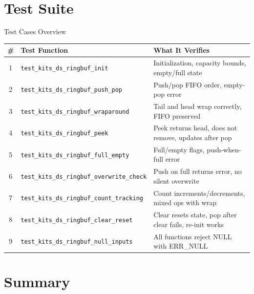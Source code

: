 \documentclass[aspectratio=169, 10pt]{beamer}
\begin{document}
\section{Test Suite}

\begin{frame}{Test Cases Overview}
\begin{table}
\centering
\small
\begin{tabular}{@{}clp{7cm}@{}}
\toprule
\textbf{\#} & \textbf{Test Function} & \textbf{What It Verifies} \\
\midrule
1 & \texttt{test\_kits\_ds\_ringbuf\_init}
  & Initialization, capacity bounds, empty/full state \\
2 & \texttt{test\_kits\_ds\_ringbuf\_push\_pop}
  & Push/pop FIFO order, empty-pop error \\
3 & \texttt{test\_kits\_ds\_ringbuf\_wraparound}
  & Tail and head wrap correctly, FIFO preserved \\
4 & \texttt{test\_kits\_ds\_ringbuf\_peek}
  & Peek returns head, does not remove, updates after pop \\
5 & \texttt{test\_kits\_ds\_ringbuf\_full\_empty}
  & Full/empty flags, push-when-full error \\
6 & \texttt{test\_kits\_ds\_ringbuf\_overwrite\_check}
  & Push on full returns error, no silent overwrite \\
7 & \texttt{test\_kits\_ds\_ringbuf\_count\_tracking}
  & Count increments/decrements, mixed ops with wrap \\
8 & \texttt{test\_kits\_ds\_ringbuf\_clear\_reset}
  & Clear resets state, pop after clear fails, re-init works \\
9 & \texttt{test\_kits\_ds\_ringbuf\_null\_inputs}
  & All functions reject NULL with ERR\_NULL \\
\bottomrule
\end{tabular}
\end{table}
\end{frame}

\section{Summary}
\end{document}
